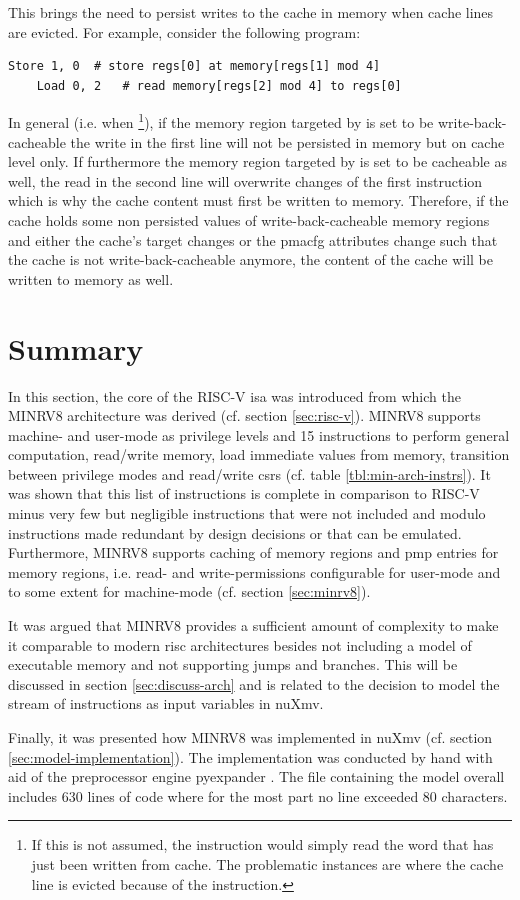 This brings the need to persist writes to the cache in memory when cache lines are evicted.
For example, consider the following program:
\begin{lstlisting}[language=minrv8]
    Store 1, 0  # store regs[0] at memory[regs[1] mod 4]
    Load 0, 2   # read memory[regs[2] mod 4] to regs[0]
\end{lstlisting}

In general (i.e. when \footnote{%
    If this is not assumed, the  instruction would simply read the word that has just been written from cache.
    The problematic instances are where the cache line is evicted because of the  instruction.
}), if the memory region targeted by  is set to be write-back-cacheable the write in the first line will not be persisted in memory but on cache level only.
If furthermore the memory region targeted by  is set to be cacheable as well, the read in the second line will overwrite changes of the first instruction which is why the cache content must first be written to memory.
Therefore, if the cache holds some non persisted values of write-back-cacheable memory regions and either the cache's target changes or the \gls{pmacfg} attributes change such that the cache is not write-back-cacheable anymore, the content of the cache will be written to memory as well.

\section{Summary}
\label{sec:arch-summary}

In this section, the core of the RISC-V \gls{isa} was introduced from which the MINRV8 architecture was derived (cf. section \ref{sec:risc-v}).
MINRV8 supports machine- and user-mode as privilege levels and 15 instructions to perform general computation, read/write memory, load immediate values from memory, transition between privilege modes and read/write \glspl{csr} (cf. table \ref{tbl:min-arch-instrs}).
It was shown that this list of instructions is complete in comparison to RISC-V minus very few but negligible instructions that were not included and modulo instructions made redundant by design decisions or that can be emulated.
Furthermore, MINRV8 supports caching of memory regions and \gls{pmp} entries for memory regions, i.e. read- and write-permissions configurable for user-mode and to some extent for machine-mode (cf. section \ref{sec:minrv8}).

It was argued that MINRV8 provides a sufficient amount of complexity to make it comparable to modern \gls{risc} architectures besides not including a model of executable memory and not supporting jumps and branches.
This will be discussed in section \ref{sec:discuss-arch} and is related to the decision to model the stream of instructions as input variables in nuXmv.

Finally, it was presented how MINRV8 was implemented in nuXmv (cf. section \ref{sec:model-implementation}).
The implementation was conducted by hand with aid of the preprocessor engine pyexpander \cite{pyexpander}.
The file containing the model overall includes 630 lines of code where for the most part no line exceeded 80 characters.
